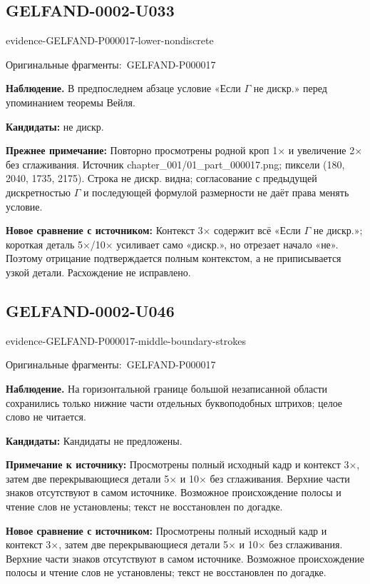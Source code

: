 \documentclass[11pt]{article}
\newcommand{\EvidenceBlock}[4]{%
 \par\smallskip\noindent\begin{minipage}{\linewidth}
 \begin{minipage}[t]{.47\linewidth}\vspace{0pt}\centering
 \csname evidence-#1-#2\endcsname\par
 {\scriptsize\SourceCropCaption\ #1}\par
 \end{minipage}\hfill
 \begin{minipage}[t]{.49\linewidth}\vspace{0pt}\raggedright
 {\small\color{orange!65!black}\textbf{#4} #3}\par
 \end{minipage}
 \end{minipage}\par\smallskip}
\newcommand{\SourceCropCaption}{Оригинальные фрагменты:}\newcommand{\ReadingCaption}{Сомнительное чтение.}\newcommand{\IncompleteCaption}{Неразобранный фрагмент.}\newcommand{\DiagramCaption}{Рисунок и набранное описание.}
\begin{document}
\subsection*{GELFAND-0002-U033}
\EvidenceBlock{GELFAND-P000017}{lower-nondiscrete}{В предпоследнем абзаце условие «Если \(\Gamma\) не дискр.» перед упоминанием теоремы Вейля.}{Наблюдение.}
\par\smallskip\noindent\textbf{Кандидаты: } не дискр.\par
\par\smallskip\noindent\textbf{Прежнее примечание: } Повторно просмотрены родной кроп 1× и увеличение 2× без сглаживания. Источник chapter\_001/01\_part\_000017.png; пиксели (180, 2040, 1735, 2175). Строка не дискр. видна; согласование с предыдущей дискретностью \(\Gamma\) и последующей формулой размерности не даёт права менять условие.\par
\par\smallskip\noindent\textbf{Новое сравнение с источником: } Контекст 3× содержит всё «Если \(\Gamma\) не дискр.»; короткая деталь 5×/10× усиливает само «дискр.», но отрезает начало «не». Поэтому отрицание подтверждается полным контекстом, а не приписывается узкой детали. Расхождение не исправлено.\par


\subsection*{GELFAND-0002-U046}
\EvidenceBlock{GELFAND-P000017}{middle-boundary-strokes}{На горизонтальной границе большой незаписанной области сохранились только нижние части отдельных буквоподобных штрихов; целое слово не читается.}{Наблюдение.}
\par\smallskip\noindent\textbf{Кандидаты: } Кандидаты не предложены.\par
\par\smallskip\noindent\textbf{Примечание к источнику: } Просмотрены полный исходный кадр и контекст 3×, затем две перекрывающиеся детали 5× и 10× без сглаживания. Верхние части знаков отсутствуют в самом источнике. Возможное происхождение полосы и чтение слов не установлены; текст не восстановлен по догадке.\par
\par\smallskip\noindent\textbf{Новое сравнение с источником: } Просмотрены полный исходный кадр и контекст 3×, затем две перекрывающиеся детали 5× и 10× без сглаживания. Верхние части знаков отсутствуют в самом источнике. Возможное происхождение полосы и чтение слов не установлены; текст не восстановлен по догадке.\par
\end{document}
